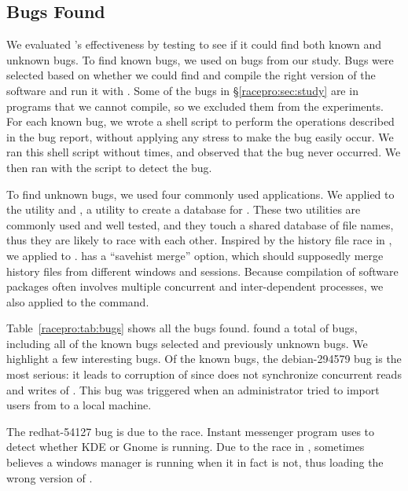 \subsection{Bugs Found} \label{racepro:sec:bug}

We evaluated \racepro's effectiveness by testing to see if it could find
both known and unknown bugs.  To find known bugs, we used \racepro on
\nraceproold bugs from our study.  Bugs were selected based on whether
we could find and compile the right version of the software and run
it with \racepro.  Some of the
bugs in \S\ref{racepro:sec:study} are in programs that we cannot compile, so we
excluded them from the experiments.  For each known bug, we wrote a shell
script to perform the operations described in the bug report, without
applying any stress to make the bug easily occur.  We ran this shell
script without  times, and observed that the bug never
occurred.  We then ran \racepro with the script to detect the bug. 

To find unknown bugs, we used four commonly used applications.  We
applied \racepro to the  utility and , a utility to
create a database for .  These two utilities are commonly
used and well tested, and they touch a shared database of file names,
thus they are likely to race with each other.  Inspired by the history
file race in , we applied \racepro to .   has a
``savehist merge'' option, which should supposedly merge history files
from different windows and sessions.  Because compilation of software
packages often involves multiple concurrent and inter-dependent
processes, we also applied \racepro to the  command.

Table~\ref{racepro:tab:bugs} shows all the bugs \racepro found.  \racepro found a
total of \nracepro bugs, including all of the known bugs selected and
\nracepronew previously unknown bugs.  We highlight a few interesting
bugs.  Of the known bugs, the debian-294579 bug is the most serious:
it leads to corruption of  since  does not
synchronize concurrent reads and writes of .  This bug
was triggered when an administrator tried to import users from
 to a local machine.  

The redhat-54127 bug is due to the  race.  
Instant messenger program  uses  to detect whether
KDE or Gnome is running.  Due to the race in , 
sometimes believes a windows manager is running when it in fact is
not, thus loading the wrong version of .

